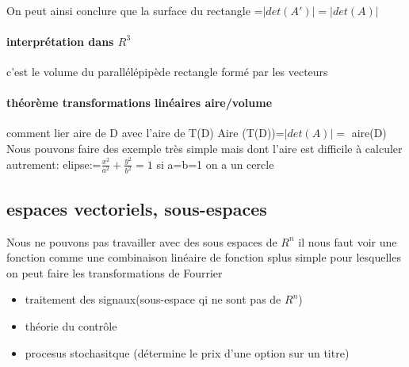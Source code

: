 \documentclass[a4paper,10pt]{article}
\begin{document}
\paragraph{}
On peut ainsi conclure que la surface du rectangle =$|det(A')|=|det(A)|$
\paragraph{interprétation dans $R^3$}
c'est le volume du parallélépipède rectangle formé par les vecteurs
\paragraph{théorème transformations linéaires aire/volume}
comment lier aire de D avec l'aire de T(D)
\newline
Aire (T(D))=$|det(A)|=$ aire(D)
\newline
Nous pouvons faire des exemple très simple mais dont l'aire est difficile à calculer autrement:
\newline
elipse:=$\frac{x^2}{a^2}+\frac{y^2}{b^2}=1$ si a=b=1 on a un cercle
\subsection{espaces vectoriels, sous-espaces}
Nous ne pouvons pas travailler avec des sous espaces de $R^n$ il nous faut voir une fonction comme une combinaison linéaire de fonction splus simple pour lesquelles on peut faire les transformations de Fourrier
\begin{itemize}
 \item traitement des signaux(sous-espace qi ne sont pas de $R^n$)
 \item théorie du contrôle
 \item procesus stochasitque (détermine le prix d'une option sur un titre)
\end{itemize}
\end{document}
